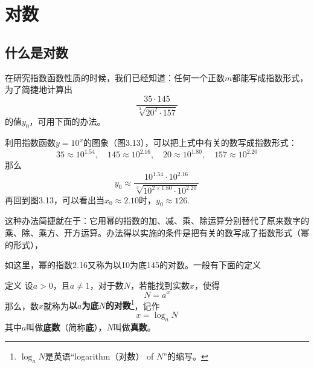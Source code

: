  \section{对数}
 \subsection{什么是对数}
 在研究指数函数性质的时候，我们已经知道：任何一个正数$m$都能写成指数形式，为了简捷地计算出
 \[\frac{35\cdot 145}{\sqrt[3]{20^2\cdot 157}}\]
 的值$y_0$，可用下面的办法。
 
 \begin{figure}[htp]
     \centering
     \caption{}
 \end{figure}
 
 
 利用指数函数$y=10^x$的图象（图3.13），可以把上式中有关的数写成指数形式：
 \[35\approx 10^{1.54},\quad 145\approx 10^{2.16},\quad 
 20\approx 10^{1.80},\quad 157\approx 10^{2.20}\]
 那么
 \[y_0\approx \frac{10^{1.54}\cdot 10^{2.16}}{\sqrt[3]{10^{2\times 1.80}\cdot 10^{2.20}}}\]
 再回到图3.13，可以看出当$x_0\approx 2.10$时，$y_0\approx 126$.
 
 这种办法简捷就在于：它用幂的指数的加、减、乘、除运算分别替代了原来数字的乘、除、乘方、开方运算。办法得以实施的条件是把有关的数写成了指数形式（幂的形式），
 \begin{center}
 \end{center}
 如这里，幂的指数2.16又称为以10为底145的对数。一般有下面的定义
 
 \begin{thm}{定义}
 设$a>0$，且$a\ne 1$，对于数$N$，若能找到实数$x$，使得
 \begin{equation}
     N=a^x\tag{1}
 \end{equation}
 那么，数$x$就称为\textbf{以$a$为底$N$的对数}\footnote{$\log_a N$是英语“logarithm（对数） of $N$”的缩写。}，记作
 \begin{equation}
     x=\log_a N \tag{2}
 \end{equation}
 其中$a$叫做\textbf{底数}（简称\textbf{底}），$N$叫做\textbf{真数}。
 \end{thm}
 
